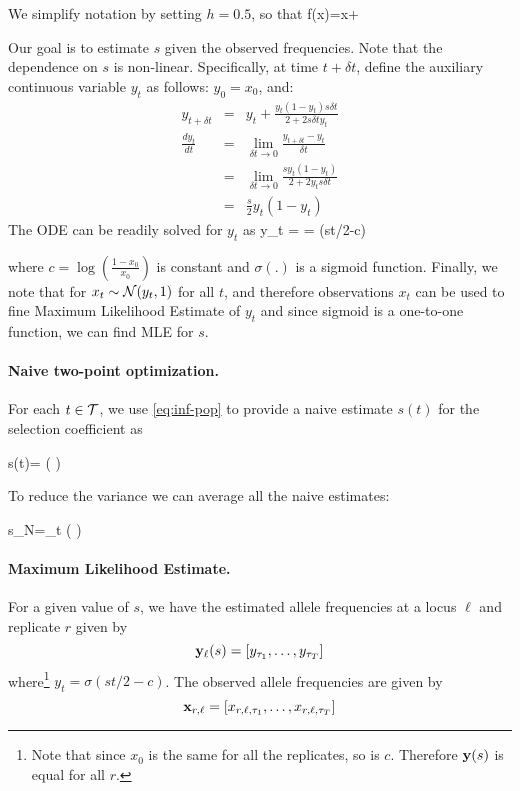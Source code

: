 We simplify notation by setting $h=0.5$, so that
\beq
f(x)=x+
\eeq

Our goal is to estimate $s$ given the observed frequencies. Note that
the dependence on $s$ is non-linear. Specifically, at time $t+\delta
t$, define the auxiliary continuous variable $y_t$ as follows:
$y_0=x_0$, and:
\begin{eqnarray}
  y_{t+\delta t} &=& y_t+\frac{y_t(1-y_t)s\delta t}{2+2s\delta t y_t}\\
  \frac{dy_t}{dt} &=&\lim_{\delta t\rightarrow 0}\frac{y_{t+\delta t} -y_t}{\delta t}\\
   &=&\lim_{\delta t\rightarrow 0}\frac{sy_t(1-y_t)}{2+2y_ts\delta t}\\
   &=& \frac{s}{2}y_t(1-y_t) 
  \label{eq:ode}
\end{eqnarray}
The ODE can be readily solved for $y_t$ as
\beq
y_t = = \sigma(st/2-c) 
\label{eq:inf-pop} 
\eeq

where $c=\log\left(\frac{1-x_0}{x_0}\right)$ is constant
\cite{multilocus-hitchhike} and $\sigma(.)$ is a sigmoid
function. Finally, we note that for $x_t\sim{\cal N}(y_t,1)$ for all $t$, 
and therefore observations $x_t$ can be used to fine Maximum Likelihood Estimate of $y_t$ and since sigmoid is a one-to-one function, we can find MLE for 
$s$.

\paragraph{Naive two-point optimization.} 
For each $t\in {\cal T}$, we use \eqref{eq:inf-pop} to provide a naive
estimate $s(t)$ for the selection coefficient as

\beq 
s(t)= \log \left(  \right) 
\eeq

To reduce the variance we can average all the naive estimates: 

\beq
s_{N}=\sum_{t\in \Tc} \log \left(  \right) 
\label{eq:naive}
\eeq


\paragraph{Maximum Likelihood Estimate.}
For a given value of $s$, we have the estimated allele frequencies at
a locus $\ell$  and replicate $r$ given by
\[
{{\mathbf y}_{\ell}(s)} = [y_{\tau_1},\ldots,y_{\tau_T}]
\]
where\footnote{Note that since $x_0$ is the same for all the replicates, so is $c$. Therefore ${\mathbf y}(s)$ is equal for all $r$. } $y_{t}=\sigma(st/2-c)$. The observed allele frequencies are
given by
\[
{{\mathbf x}_{r,\ell}} = [x_{r,\ell,\tau_1},\ldots,x_{r,\ell,\tau_T}]
\]

